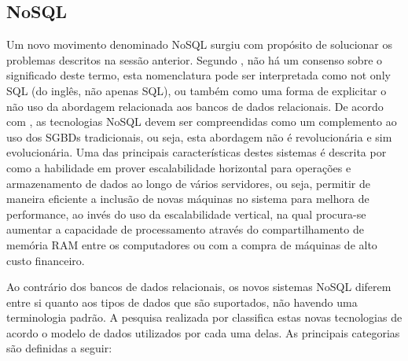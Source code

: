 \subsection{NoSQL}

Um novo movimento denominado NoSQL surgiu com propósito de solucionar os problemas  descritos na sessão anterior. Segundo , não há um consenso sobre o significado deste termo, esta nomenclatura pode ser interpretada como not only SQL (do inglês, não apenas SQL), ou também como uma forma de explicitar o não uso da abordagem relacionada aos bancos de dados relacionais. De acordo com , as tecnologias NoSQL devem ser compreendidas como um complemento ao uso dos SGBDs tradicionais, ou seja, esta abordagem não é revolucionária e sim evolucionária. Uma das principais características destes sistemas é descrita por  como a habilidade em prover escalabilidade horizontal para operações e armazenamento de dados ao longo de vários servidores, ou seja, permitir de maneira eficiente a inclusão de novas máquinas no sistema para melhora de performance, ao invés do uso da escalabilidade vertical, na qual procura-se aumentar a capacidade de processamento através do compartilhamento de memória RAM entre os computadores ou com a compra de máquinas de alto custo financeiro.

Ao contrário dos bancos de dados relacionais, os novos sistemas NoSQL diferem entre si quanto aos tipos de dados que são suportados, não havendo uma terminologia padrão. A pesquisa realizada por  classifica estas novas tecnologias de acordo o modelo de dados utilizados por cada uma delas. As principais categorias são definidas a seguir:

